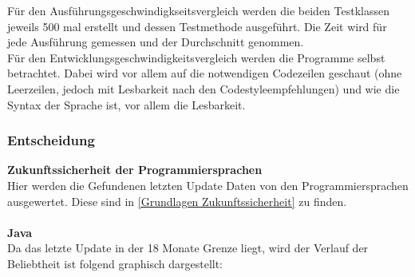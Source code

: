\documentclass[ngerman]{article}
\begin{document}
    Für den Ausführungsgeschwindigkseitsvergleich werden die beiden Testklassen jeweils 500 mal erstellt und dessen Testmethode ausgeführt. Die Zeit wird für jede Ausführung gemessen und der Durchschnitt genommen.\\
    Für den Entwicklungsgeschwindigkeitsvergleich werden die Programme selbst betrachtet. Dabei wird vor allem auf die notwendigen Codezeilen geschaut (ohne Leerzeilen, jedoch mit Lesbarkeit nach den Codestyleempfehlungen) und wie die Syntax der Sprache ist, vor allem die Lesbarkeit.\\
    \subsubsection{Entscheidung}
    \label{ProgrammiersprachenEntscheidung}
    \textbf{Zukunftssicherheit der Programmiersprachen}\\
    Hier werden die Gefundenen letzten Update Daten von den Programmiersprachen ausgewertet. Diese sind in \ref{Grundlagen Zukunftssicherheit} zu finden.\\\\
    \textbf{Java}\\
    Da das letzte Update in der 18 Monate Grenze liegt, wird der Verlauf der Beliebtheit ist folgend graphisch dargestellt:
\end{document}
